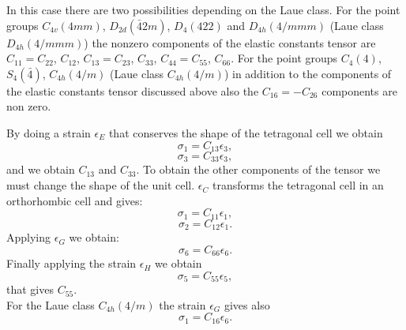 \documentclass[12pt,a4paper,twoside]{report}
\begin{document}
In this case there are two possibilities depending on the Laue class.
For the point groups $C_{4v} (4mm)$, $D_{2d} (\bar42m)$, $D_4 (422)$ and
$D_{4h} (4/mmm)$ (Laue class $D_{4h} (4/mmm)$) the nonzero components of the 
elastic constants tensor are
$C_{11}=C_{22}$, $C_{12}$, $C_{13}=C_{23}$, $C_{33}$, $C_{44}=C_{55}$, 
$C_{66}$.
For the point groups $C_{4} (4)$, $S_{4} (\bar4)$, $C_{4h} (4/m)$ (Laue class
$C_{4h} (4/m)$) in addition to the components of the elastic constants tensor
discussed above also the $C_{16}=-C_{26}$ components are non zero.

By doing a strain $\epsilon_E$ that conserves the shape of the tetragonal
cell we obtain
\begin{equation}
\sigma_{1} = C_{13} \epsilon_3,
\end{equation}
\begin{equation}
\sigma_{3} = C_{33} \epsilon_3,
\end{equation}
and we obtain $C_{13}$ and $C_{33}$.
To obtain the other components of the tensor we must change the shape of the 
unit cell. $\epsilon_C$ transforms the tetragonal cell in an orthorhombic cell 
and gives:
\begin{equation}
\sigma_{1} = C_{11} \epsilon_1, 
\end{equation}
\begin{equation}
\sigma_{2} = C_{12} \epsilon_1.
\end{equation}
Applying $\epsilon_G$ we obtain:
\begin{equation}
\sigma_{6} = C_{66} \epsilon_6.
\end{equation}
Finally applying the strain $\epsilon_H$ we obtain
\begin{equation}
\sigma_{5} = C_{55} \epsilon_5,
\end{equation}
that gives $C_{55}$. \\
For the Laue class $C_{4h} (4/m)$ the strain $\epsilon_G$ gives also 
\begin{equation}
\sigma_{1} = C_{16} \epsilon_6.
\end{equation}
\end{document}
